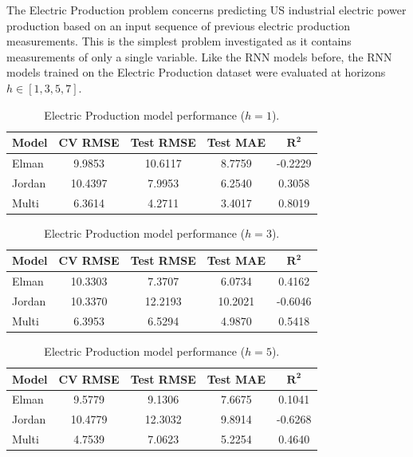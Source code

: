 \documentclass[conference]{IEEEtran}
\begin{document}
The Electric Production problem concerns predicting US industrial electric power production based on an input sequence of previous electric production measurements. This is the simplest problem investigated as it contains measurements of only a single variable. Like the RNN models before, the RNN models trained on the Electric Production dataset were evaluated at horizons $h \in [1,3,5,7]$.

\begin{table}[H]
\centering
\caption{Electric Production model performance ($h=1$).}
\label{tab:ep_h1}
\begin{tabular}{lcccc}
\toprule
\textbf{Model} & \textbf{CV RMSE} & \textbf{Test RMSE} & \textbf{Test MAE} & $\mathbf{R^2}$ \\
\midrule
Elman  & 9.9853  & 10.6117 & 8.7759 & -0.2229 \\
Jordan & 10.4397 & 7.9953  & 6.2540 & 0.3058 \\
Multi  & 6.3614  & 4.2711  & 3.4017 & 0.8019 \\
\bottomrule
\end{tabular}
\end{table}

\begin{table}[H]
\centering
\caption{Electric Production model performance ($h=3$).}
\label{tab:ep_h3}
\begin{tabular}{lcccc}
\toprule
\textbf{Model} & \textbf{CV RMSE} & \textbf{Test RMSE} & \textbf{Test MAE} & $\mathbf{R^2}$ \\
\midrule
Elman  & 10.3303 & 7.3707  & 6.0734 & 0.4162 \\
Jordan & 10.3370 & 12.2193 & 10.2021 & -0.6046 \\
Multi  & 6.3953  & 6.5294  & 4.9870 & 0.5418 \\
\bottomrule
\end{tabular}
\end{table}

\begin{table}[H]
\centering
\caption{Electric Production model performance ($h=5$).}
\label{tab:ep_h5}
\begin{tabular}{lcccc}
\toprule
\textbf{Model} & \textbf{CV RMSE} & \textbf{Test RMSE} & \textbf{Test MAE} & $\mathbf{R^2}$ \\
\midrule
Elman  & 9.5779  & 9.1306  & 7.6675 & 0.1041 \\
Jordan & 10.4779 & 12.3032 & 9.8914 & -0.6268 \\
Multi  & 4.7539  & 7.0623  & 5.2254 & 0.4640 \\
\bottomrule
\end{tabular}
\end{table}
\end{document}
